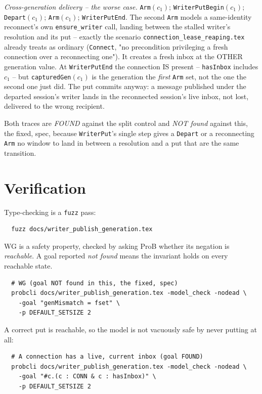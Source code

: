 \documentclass[a4paper,10pt,fleqn]{article}
\begin{document}
\emph{Cross-generation delivery -- the worse case.}
\texttt{Arm}$(c_1)$; \texttt{WriterPutBegin}$(c_1)$; \texttt{Depart}$(c_1)$;
\texttt{Arm}$(c_1)$; \texttt{WriterPutEnd}. The second \texttt{Arm} models a
same-identity reconnect's own \texttt{ensure\_writer} call, landing between
the stalled writer's resolution and its put -- exactly the scenario
\texttt{connection\_lease\_reaping.tex} already treats as ordinary
(\texttt{Connect}, "no precondition privileging a fresh connection over a
reconnecting one"). It creates a fresh inbox at the OTHER generation value.
At \texttt{WriterPutEnd} the connection IS present -- \texttt{hasInbox}
includes $c_1$ -- but \texttt{capturedGen}$(c_1)$ is the generation the
\emph{first} \texttt{Arm} set, not the one the second one just did. The put
commits anyway: a message published under the departed session's writer
lands in the reconnected session's live inbox, not lost, delivered to the
wrong recipient.

Both traces are \emph{FOUND} against the split control and \emph{NOT found}
against this, the fixed, spec, because \texttt{WriterPut}'s single step
gives a \texttt{Depart} or a reconnecting \texttt{Arm} no window to land in
between a resolution and a put that are the same transition.

\section{Verification}
\label{sec:verify}

Type-checking is a \texttt{fuzz} pass:
\begin{verbatim}
  fuzz docs/writer_publish_generation.tex
\end{verbatim}

WG is a safety property, checked by asking ProB whether its negation is
\emph{reachable}. A goal reported \emph{not found} means the invariant
holds on every reachable state.

\begin{verbatim}
  # WG (goal NOT found in this, the fixed, spec)
  probcli docs/writer_publish_generation.tex -model_check -nodead \
    -goal "genMismatch = fset" \
    -p DEFAULT_SETSIZE 2
\end{verbatim}

A correct put is reachable, so the model is not vacuously safe by never
putting at all:

\begin{verbatim}
  # A connection has a live, current inbox (goal FOUND)
  probcli docs/writer_publish_generation.tex -model_check -nodead \
    -goal "#c.(c : CONN & c : hasInbox)" \
    -p DEFAULT_SETSIZE 2
\end{verbatim}
\end{document}
